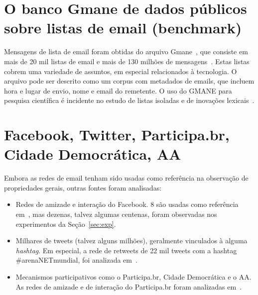 \documentclass[a4paper,openright,12pt]{report} %
\begin{document}
\section{O banco Gmane de dados públicos sobre listas de email (benchmark)}

Mensagens de lista de email foram obtidas do arquivo Gmane~\cite{gmanePack},
que consiste em mais de 20 mil listas de email e mais de 130 milhões de mensagens~\cite{GMANEwikipedia}.
Estas listas cobrem uma variedade de assuntos, em especial
relacionados à tecnologia. O arquivo pode ser descrito como
um corpus com metadados de emails, que incluem hora e lugar
de envio, nome e email do remetente. O uso do GMANE para
pesquisa científica é incidente no estudo de listas isoladas
e de inovações lexicais~\cite{GMANE2,bird}. 

\section{Facebook, Twitter, Participa.br, Cidade Democrática, AA}
Embora as redes de email tenham sido usadas como referência
na observação de propriedades gerais, outras fontes
foram analisadas:

\begin{itemize}
	\item Redes de amizade e interação do Facebook. 8 são usadas como referência em~\cite{timeS}, mas dezenas, talvez algumas centenas, foram observadas nos experimentos da Seção~\ref{sec:exp}.
	\item Milhares de tweets (talvez alguns milhões), geralmente vinculados à alguma \emph{hashtag}. Em especial, a rede de retweets de 22 mil tweets com a hashtag \#arenaNETmundial, foi analizada em~\cite{timeS}.
	\item Mecanismos participativos como o Participa.br, Cidade Democrática e o AA. As redes de amizade e de interação do Participa.br foram analizadas em~\cite{timeS}.
\end{itemize}
\end{document}
